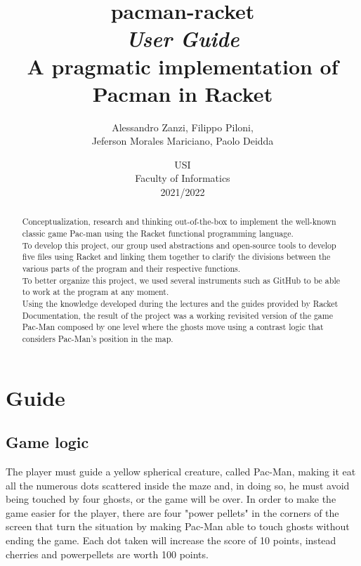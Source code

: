 \documentclass{article}
\title{
\textbf{pacman-racket} \\
\textit{User Guide}\\
A pragmatic implementation of Pacman in Racket\\
}
\author{
    Alessandro Zanzi,
    Filippo Piloni,\\
    Jeferson Morales Mariciano,
    Paolo Deidda
}
\date{
USI \\
Faculty of Informatics \\
[\baselineskip]  2021/2022
}
\begin{document}
\begin{titlepage}
\maketitle  
\thispagestyle{empty}
\end{titlepage}
\begin{abstract}
Conceptualization, research and thinking out-of-the-box
to implement the well-known classic game Pac-man
using the Racket functional programming language.\\
To develop this project, our group used abstractions and open-source tools to develop five files using Racket and linking them together to clarify the divisions between the various parts of the program and their respective functions.\\
To better organize this project, we used several instruments such as GitHub to be able to work at the program at any moment.\\
Using the knowledge developed during the lectures and the guides provided by Racket Documentation, the result of the project was a working revisited version of the game Pac-Man composed by one level where the ghosts move using a contrast logic that considers Pac-Man's position in the map.

\end{abstract}
\clearpage
\tableofcontents
\clearpage

\section{Guide}

\subsection{Game logic}
 The player must guide a yellow spherical creature, called Pac-Man, making it eat all the numerous dots scattered inside the maze and, in doing so, he must avoid being touched by four ghosts, or the game will be over. In order to make the game easier for the player, there are four "power pellets" in the corners of the screen that turn the situation by making Pac-Man able to touch ghosts without ending the game. Each dot taken will increase the score of 10 points, instead cherries and powerpellets are worth 100 points.
\end{document}
